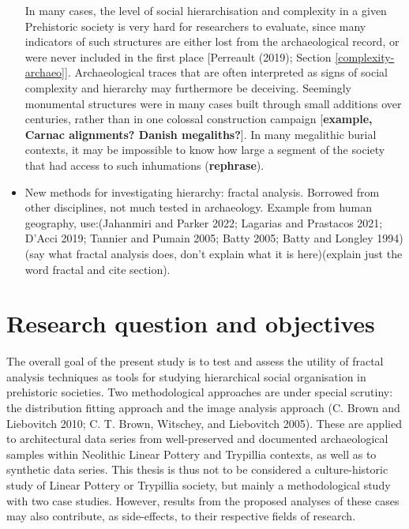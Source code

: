 \documentclass[
  12pt,
  a4paper, twoside]{book}
\begin{document}
\begin{itemize}
  In many cases, the level of social hierarchisation and complexity in a given Prehistoric society is very hard for researchers to evaluate, since many indicators of such structures are either lost from the archaeological record, or were never included in the first place {[}Perreault (2019); Section \ref{complexity-archaeo}{]}. Archaeological traces that are often interpreted as signs of social complexity and hierarchy may furthermore be deceiving. Seemingly monumental structures were in many cases built through small additions over centuries, rather than in one colossal construction campaign {[}\textbf{example, Carnac alignments? Danish megaliths?}{]}. In many megalithic burial contexts, it may be impossible to know how large a segment of the society that had access to such inhumations (\textbf{rephrase}).
\item
  New methods for investigating hierarchy: fractal analysis. Borrowed from other disciplines, not much tested in archaeology. Example from human geography, use:(Jahanmiri and Parker 2022; Lagarias and Prastacos 2021; D'Acci 2019; Tannier and Pumain 2005; Batty 2005; Batty and Longley 1994) (say what fractal analysis does, don't explain what it is here)(explain just the word fractal and cite section).
\end{itemize}

\hypertarget{research-question-and-objectives}{%
\section{Research question and objectives}\label{research-question-and-objectives}}

The overall goal of the present study is to test and assess the utility of fractal analysis techniques as tools for studying hierarchical social organisation in prehistoric societies. Two methodological approaches are under special scrutiny: the distribution fitting approach and the image analysis approach (C. Brown and Liebovitch 2010; C. T. Brown, Witschey, and Liebovitch 2005). These are applied to architectural data series from well-preserved and documented archaeological samples within Neolithic Linear Pottery and Trypillia contexts, as well as to synthetic data series. This thesis is thus not to be considered a culture-historic study of Linear Pottery or Trypillia society, but mainly a methodological study with two case studies. However, results from the proposed analyses of these cases may also contribute, as side-effects, to their respective fields of research.
\end{document}
